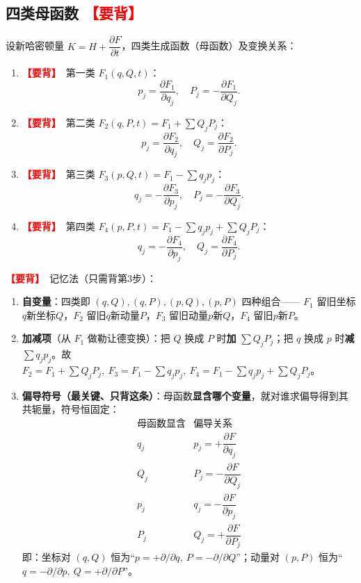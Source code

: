\documentclass[UTF8,a4paper,11pt]{ctexart}
\newcommand{\bp}[1]{\textcolor{red}{\textbf{【要背】}}\ #1}
\begin{document}
\subsection{四类母函数 \bp{}}
设新哈密顿量 $K=H+\dfrac{\partial F}{\partial t}$，四类生成函数（母函数）及变换关系：
\begin{enumerate}[itemsep=2pt]
  \item \bp{第一类 $F_1(q,Q,t)$}：
  \[
  p_j=\frac{\partial F_1}{\partial q_j},\quad P_j=-\frac{\partial F_1}{\partial Q_j}.
  \]
  \item \bp{第二类 $F_2(q,P,t)=F_1+\sum Q_jP_j$}：
  \[
  p_j=\frac{\partial F_2}{\partial q_j},\quad Q_j=\frac{\partial F_2}{\partial P_j}.
  \]
  \item \bp{第三类 $F_3(p,Q,t)=F_1-\sum q_jp_j$}：
  \[
  q_j=-\frac{\partial F_3}{\partial p_j},\quad P_j=-\frac{\partial F_3}{\partial Q_j}.
  \]
  \item \bp{第四类 $F_4(p,P,t)=F_1-\sum q_jp_j+\sum Q_jP_j$}：
  \[
  q_j=-\frac{\partial F_4}{\partial p_j},\quad Q_j=\frac{\partial F_4}{\partial P_j}.
  \]
\end{enumerate}
\bp{记忆法（只需背第3步）}：
\begin{enumerate}[itemsep=2pt]
  \item \textbf{自变量}：四类即 $(q,Q),(q,P),(p,Q),(p,P)$ 四种组合——
  $F_1$ 留旧坐标$q$新坐标$Q$，$F_2$ 留旧$q$新动量$P$，$F_3$ 留旧动量$p$新$Q$，$F_4$ 留旧$p$新$P$。
  \item \textbf{加减项}（从 $F_1$ 做勒让德变换）：把 $Q$ 换成 $P$ 时\textbf{加} $\sum Q_jP_j$；把 $q$ 换成 $p$ 时\textbf{减} $\sum q_jp_j$。故
  $F_2=F_1+\sum Q_jP_j,\ F_3=F_1-\sum q_jp_j,\ F_4=F_1-\sum q_jp_j+\sum Q_jP_j$。
  \item \textbf{偏导符号（最关键、只背这条）}：母函数\textbf{显含哪个变量}，就对谁求偏导得到其共轭量，符号恒固定：
  \[
  \begin{array}{c|c}
  \text{母函数显含} & \text{偏导关系} \\ \hline
  q_j & p_j=+\dfrac{\partial F}{\partial q_j} \\[6pt]
  Q_j & P_j=-\dfrac{\partial F}{\partial Q_j} \\[6pt]
  p_j & q_j=-\dfrac{\partial F}{\partial p_j} \\[6pt]
  P_j & Q_j=+\dfrac{\partial F}{\partial P_j}
  \end{array}
  \]
  即：坐标对 $(q,Q)$ 恒为“$p=+\partial/\partial q,\ P=-\partial/\partial Q$”；动量对 $(p,P)$ 恒为“$q=-\partial/\partial p,\ Q=+\partial/\partial P$”。
\end{enumerate}
\end{document}
